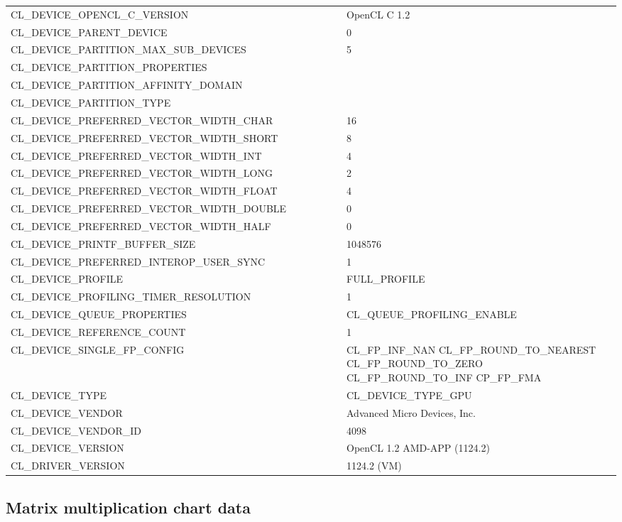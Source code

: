 \begin{longtable}{p{0.55\linewidth} p{0.45\linewidth}}
CL\_DEVICE\_OPENCL\_C\_VERSION & OpenCL C 1.2  \\
CL\_DEVICE\_PARENT\_DEVICE & 0 \\
CL\_DEVICE\_PARTITION\_MAX\_SUB\_DEVICES & 5 \\
CL\_DEVICE\_PARTITION\_PROPERTIES &  \\
CL\_DEVICE\_PARTITION\_AFFINITY\_DOMAIN &  \\
CL\_DEVICE\_PARTITION\_TYPE &  \\
CL\_DEVICE\_PREFERRED\_VECTOR\_WIDTH\_CHAR & 16 \\
CL\_DEVICE\_PREFERRED\_VECTOR\_WIDTH\_SHORT & 8 \\
CL\_DEVICE\_PREFERRED\_VECTOR\_WIDTH\_INT & 4 \\
CL\_DEVICE\_PREFERRED\_VECTOR\_WIDTH\_LONG & 2 \\
CL\_DEVICE\_PREFERRED\_VECTOR\_WIDTH\_FLOAT & 4 \\
CL\_DEVICE\_PREFERRED\_VECTOR\_WIDTH\_DOUBLE & 0 \\
CL\_DEVICE\_PREFERRED\_VECTOR\_WIDTH\_HALF & 0 \\
CL\_DEVICE\_PRINTF\_BUFFER\_SIZE & 1048576 \\
CL\_DEVICE\_PREFERRED\_INTEROP\_USER\_SYNC & 1 \\
CL\_DEVICE\_PROFILE & FULL\_PROFILE \\
CL\_DEVICE\_PROFILING\_TIMER\_RESOLUTION & 1 \\
CL\_DEVICE\_QUEUE\_PROPERTIES & CL\_QUEUE\_PROFILING\_ENABLE  \\
CL\_DEVICE\_REFERENCE\_COUNT & 1 \\
CL\_DEVICE\_SINGLE\_FP\_CONFIG & CL\_FP\_INF\_NAN \newline CL\_FP\_ROUND\_TO\_NEAREST \newline CL\_FP\_ROUND\_TO\_ZERO \newline CL\_FP\_ROUND\_TO\_INF \newline CP\_FP\_FMA \\
CL\_DEVICE\_TYPE & CL\_DEVICE\_TYPE\_GPU \\
CL\_DEVICE\_VENDOR & Advanced Micro Devices, Inc. \\
CL\_DEVICE\_VENDOR\_ID & 4098 \\
CL\_DEVICE\_VERSION & OpenCL 1.2 AMD-APP (1124.2) \\
CL\_DRIVER\_VERSION & 1124.2 (VM) \\
\end{longtable}

\subsection{Matrix multiplication chart data}
\label{sec:matrix_mul_chart_data}

